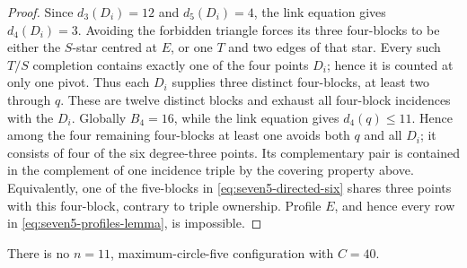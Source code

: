 \begin{proof}
Since \(d_3(D_i)=12\) and \(d_5(D_i)=4\), the link equation gives
\(d_4(D_i)=3\).  Avoiding the forbidden triangle forces its three
four-blocks to be either the \(S\)-star centred at \(E\), or one \(T\) and
two edges of that star.  Every such \(T/S\) completion contains exactly one
of the four points \(D_i\); hence it is counted at only one pivot.  Thus each
\(D_i\) supplies three distinct four-blocks, at least two through \(q\).
These are twelve distinct blocks
and exhaust all four-block incidences with the \(D_i\).  Globally
\(B_4=16\), while the link equation gives \(d_4(q)\le11\).  Hence among the
four remaining four-blocks at least one avoids both \(q\) and all \(D_i\);
it consists of four of the six degree-three points.  Its complementary pair
is contained in the complement of one incidence triple by the covering
property above.  Equivalently, one of the five-blocks in
\eqref{eq:seven5-directed-six} shares three points with this four-block,
contrary to triple ownership.  Profile \(E\), and hence every row in
\eqref{eq:seven5-profiles-lemma}, is impossible.
\end{proof}

\begin{lemma}[The $C=40$ endpoint dispatch]\label{lem:n11-C40}
There is no $n=11$, maximum-circle-five configuration with $C=40$.
\end{lemma}


